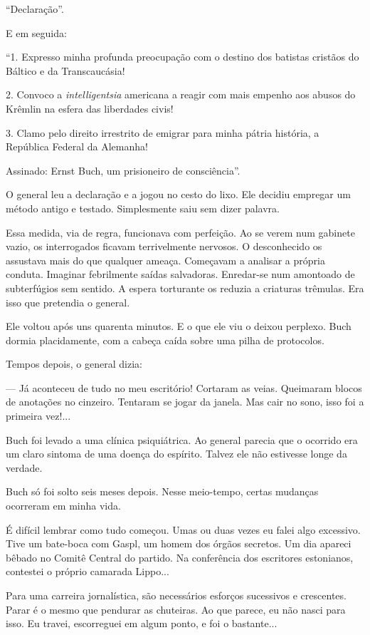 ``Declaração''.

E em seguida:

``1. Expresso minha profunda preocupação com o destino dos batistas
cristãos do Báltico e da Transcaucásia!

2. Convoco a \emph{intelligentsia} americana a reagir com mais empenho
aos abusos do Krêmlin na esfera das liberdades civis!

3. Clamo pelo direito irrestrito de emigrar para minha pátria história,
a República Federal da Alemanha!

Assinado: Ernst Buch, um prisioneiro de consciência''.

O general leu a declaração e a jogou no cesto do lixo. Ele decidiu
empregar um método antigo e testado. Simplesmente saiu sem dizer
palavra.

Essa medida, via de regra, funcionava com perfeição. Ao se verem num
gabinete vazio, os interrogados ficavam terrivelmente nervosos. O
desconhecido os assustava mais do que qualquer ameaça. Começavam a
analisar a própria conduta. Imaginar febrilmente saídas salvadoras.
Enredar-se num amontoado de subterfúgios sem sentido. A espera
torturante os reduzia a criaturas trêmulas. Era isso que pretendia o
general.

Ele voltou após uns quarenta minutos. E o que ele viu o deixou perplexo.
Buch dormia placidamente, com a cabeça caída sobre uma pilha de
protocolos.

Tempos depois, o general dizia:

--- Já aconteceu de tudo no meu escritório! Cortaram as veias. Queimaram
blocos de anotações no cinzeiro. Tentaram se jogar da janela. Mas cair
no sono, isso foi a primeira vez!...

Buch foi levado a uma clínica psiquiátrica. Ao general parecia que o
ocorrido era um claro sintoma de uma doença do espírito. Talvez ele não
estivesse longe da verdade.

Buch só foi solto seis meses depois. Nesse meio-tempo, certas mudanças
ocorreram em minha vida.

É difícil lembrar como tudo começou. Umas ou duas vezes eu falei algo
excessivo. Tive um bate-boca com Gaspl, um homem dos órgãos secretos. Um
dia apareci bêbado no Comitê Central do partido. Na conferência dos
escritores estonianos, contestei o próprio camarada Lippo...

Para uma carreira jornalística, são necessários esforços sucessivos e
crescentes. Parar é o mesmo que pendurar as chuteiras. Ao que parece, eu
não nasci para isso. Eu travei, escorreguei em algum ponto, e foi o
bastante...

